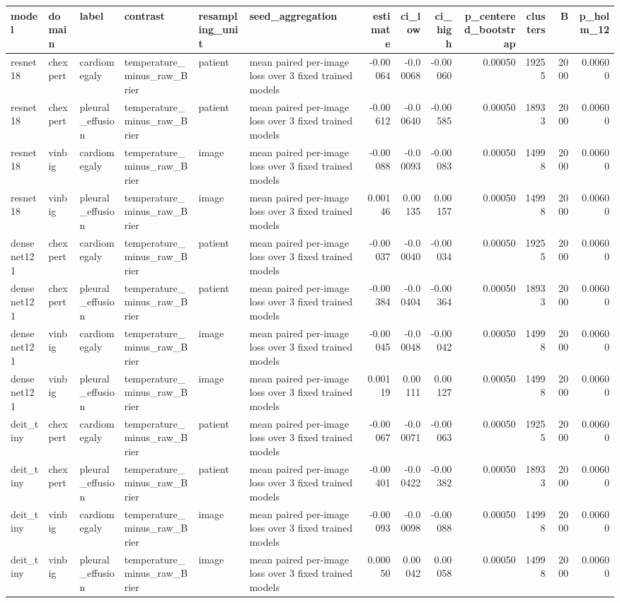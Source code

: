 \begin{tabular}{llllllrrrrrrr}
\toprule
model & domain & label & contrast & resampling\_unit & seed\_aggregation & estimate & ci\_low & ci\_high & p\_centered\_bootstrap & clusters & B & p\_holm\_12 \\
\midrule
resnet18 & chexpert & cardiomegaly & temperature\_minus\_raw\_Brier & patient & mean paired per-image loss over 3 fixed trained models & -0.00064 & -0.00068 & -0.00060 & 0.00050 & 19255 & 2000 & 0.00600 \\
resnet18 & chexpert & pleural\_effusion & temperature\_minus\_raw\_Brier & patient & mean paired per-image loss over 3 fixed trained models & -0.00612 & -0.00640 & -0.00585 & 0.00050 & 18933 & 2000 & 0.00600 \\
resnet18 & vinbig & cardiomegaly & temperature\_minus\_raw\_Brier & image & mean paired per-image loss over 3 fixed trained models & -0.00088 & -0.00093 & -0.00083 & 0.00050 & 14998 & 2000 & 0.00600 \\
resnet18 & vinbig & pleural\_effusion & temperature\_minus\_raw\_Brier & image & mean paired per-image loss over 3 fixed trained models & 0.00146 & 0.00135 & 0.00157 & 0.00050 & 14998 & 2000 & 0.00600 \\
densenet121 & chexpert & cardiomegaly & temperature\_minus\_raw\_Brier & patient & mean paired per-image loss over 3 fixed trained models & -0.00037 & -0.00040 & -0.00034 & 0.00050 & 19255 & 2000 & 0.00600 \\
densenet121 & chexpert & pleural\_effusion & temperature\_minus\_raw\_Brier & patient & mean paired per-image loss over 3 fixed trained models & -0.00384 & -0.00404 & -0.00364 & 0.00050 & 18933 & 2000 & 0.00600 \\
densenet121 & vinbig & cardiomegaly & temperature\_minus\_raw\_Brier & image & mean paired per-image loss over 3 fixed trained models & -0.00045 & -0.00048 & -0.00042 & 0.00050 & 14998 & 2000 & 0.00600 \\
densenet121 & vinbig & pleural\_effusion & temperature\_minus\_raw\_Brier & image & mean paired per-image loss over 3 fixed trained models & 0.00119 & 0.00111 & 0.00127 & 0.00050 & 14998 & 2000 & 0.00600 \\
deit\_tiny & chexpert & cardiomegaly & temperature\_minus\_raw\_Brier & patient & mean paired per-image loss over 3 fixed trained models & -0.00067 & -0.00071 & -0.00063 & 0.00050 & 19255 & 2000 & 0.00600 \\
deit\_tiny & chexpert & pleural\_effusion & temperature\_minus\_raw\_Brier & patient & mean paired per-image loss over 3 fixed trained models & -0.00401 & -0.00422 & -0.00382 & 0.00050 & 18933 & 2000 & 0.00600 \\
deit\_tiny & vinbig & cardiomegaly & temperature\_minus\_raw\_Brier & image & mean paired per-image loss over 3 fixed trained models & -0.00093 & -0.00098 & -0.00088 & 0.00050 & 14998 & 2000 & 0.00600 \\
deit\_tiny & vinbig & pleural\_effusion & temperature\_minus\_raw\_Brier & image & mean paired per-image loss over 3 fixed trained models & 0.00050 & 0.00042 & 0.00058 & 0.00050 & 14998 & 2000 & 0.00600 \\
\bottomrule
\end{tabular}
